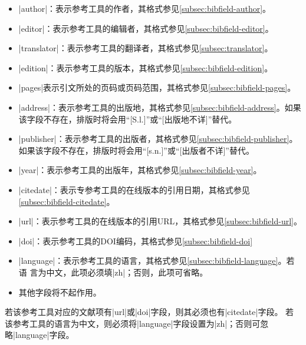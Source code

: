 \begin{itemize}
\item |author|：表示参考工具的作者，其格式参见\ref{subsec:bibfield-author}。
\item |editor|：表示参考工具的编辑者，其格式参见\ref{subsec:bibfield-editor}。
\item |translator|：表示参考工具的翻译者，其格式参见\ref{subsec:translator}。
\item |edition|：表示参考工具的版本，其格式参见\ref{subsec:bibfield-edition}。
\item |pages|表示引文所处的页码或页码范围，其格式参见\ref{subsec:bibfield-pages}。
\item |address|：表示参考工具的出版地，其格式参见\ref{subsec:bibfield-address}。如果
  该字段不存在，{\BibTeX}排版时将会用``[S.l.]''或``[出版地不详]''替代。
\item |publisher|：表示参考工具的出版者，其格式参见\ref{subsec:bibfield-publisher}。
  如果该字段不存在，{\BibTeX}排版时将会用``[s.n.]''或``[出版者不详]''替代。
\item |year|：表示参考工具的出版年，其格式参见\ref{subsec:bibfield-year}。
\item |citedate|：表示专参考工具的在线版本的引用日期，其格式参见\ref{subsec:bibfield-citedate}。
\item |url|：表示参考工具的在线版本的引用URL，其格式参见\ref{subsec:bibfield-url}。
\item |doi|：表示参考工具的DOI编码，其格式参见\ref{subsec:bibfield-doi}
\item |language|：表示参考工具的语言，其格式参见\ref{subsec:bibfield-language}。若语
  言为中文，此项必须填|zh|；否则，此项可省略。
\item 其他字段将不起作用。
\end{itemize}


\begin{note}
若该参考工具对应的文献项有|url|或|doi|字段，则其必须也有|citedate|字段。
若该参考工具的语言为中文，则必须将|language|字段设置为|zh|；否则可忽略|language|字段。
\end{note}